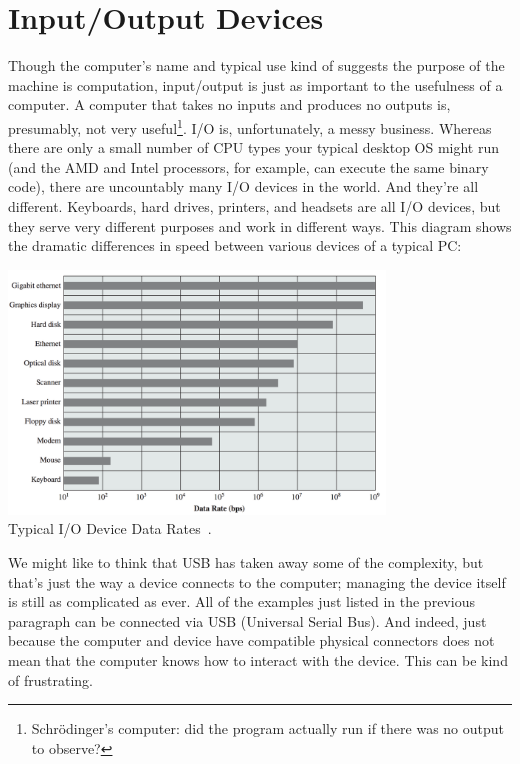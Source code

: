 




\section*{Input/Output Devices}
Though the computer's name and typical use kind of suggests the purpose of the machine is computation, input/output is just as important to the usefulness of a computer. A computer that takes no inputs and produces no outputs is, presumably, not very useful\footnote{Schr\"odinger's computer: did the program actually run if there was no output to observe?}. I/O is, unfortunately, a messy business. Whereas there are only a small number of CPU types your typical desktop OS might run (and the AMD and Intel processors, for example, can execute the same binary code), there are uncountably many I/O devices in the world. And they're all different. Keyboards, hard drives, printers, and headsets are all I/O devices, but they serve very different purposes and work in different ways. This diagram shows the dramatic differences in speed between various devices of a typical PC:

\begin{center}
	\includegraphics[width=0.75\textwidth]{images/io-device-rates.png}\\
	Typical I/O Device Data Rates~\cite{osi}.
\end{center}

We might like to think that USB has taken away some of the complexity, but that's just the way a device connects to the computer; managing the device itself is still as complicated as ever. All of the examples just listed in the previous paragraph can be connected via USB (Universal Serial Bus). And indeed, just because the computer and device have compatible physical connectors does not mean that the computer knows how to interact with the device. This can be kind of frustrating.

